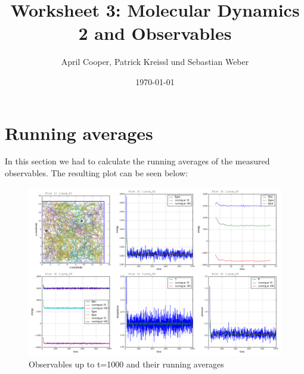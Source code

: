 \documentclass[12pt,a4paper]{scrartcl}
\author{April Cooper, Patrick Kreissl und Sebastian Weber}
\title{Worksheet 3: Molecular Dynamics 2 and Observables}
\date{\today}
\begin{document}
\maketitle
\tableofcontents
\newpage

\section{Running averages}
In this section we had to calculate the running averages of the measured observables.
The resulting plot can be  seen below:
\begin{figure}[H]
\centering
\includegraphics[width=16.0cm]{../plots/t1000.png}
\caption{Observables up to t=1000 and their running averages}
\label{fig:running averages}
\end{figure}
\end{document}

